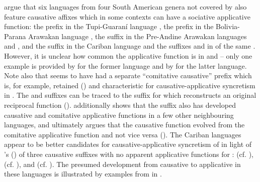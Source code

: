 \citet[391]{guillaume:rose:2010} argue that six languages from four South American genera not covered by \citet{shibatani:pardeshi:2002} also feature causative affixes which in some contexts can have a sociative applicative function: the prefix  in the Tupi-Guaraní language , the prefix  in the Bolivia-Parana Arawakan language , the suffix  in the Pre-Andine Arawakan languages  and , and the suffix  in the Cariban language  and the suffixes  and  in  of the same . However, it is unclear how common the applicative function is in  and  -- only one example is provided by \citet[522]{velazquez-castillo:2002} for the former language and by \citet[98]{wise:1990} for the latter language. Note also that  seems to have had a separate “comitative causative” prefix  \citep[593]{jensen:1998} which is, for example, retained () and characteristic for causative-applicative syncretism in  \citep{rose:2003}. The  and  suffixes can be traced to the  suffix  for which \citet[109]{wise:1990} reconstructs an original reciprocal function (). \citet[104, 110]{wise:1990} additionally shows that the suffix also has developed causative and comitative applicative functions in a few other neighbouring languages, and ultimately argues that the causative function evolved from the comitative applicative function and not vice versa (). The Cariban languages appear to be better candidates for causative-applicative syncretism of  in light of \citeauthor{gildea:2015}’s (\citeyear[6ff.]{gildea:2015})  of three causative suffixes with no apparent applicative functions for :  (cf.  ),  (cf.  ), and  (cf.  ). The presumed development from causative to applicative in these languages is illustrated by examples from  in  \citep[41, 125f.]{abbott:1991}. 

